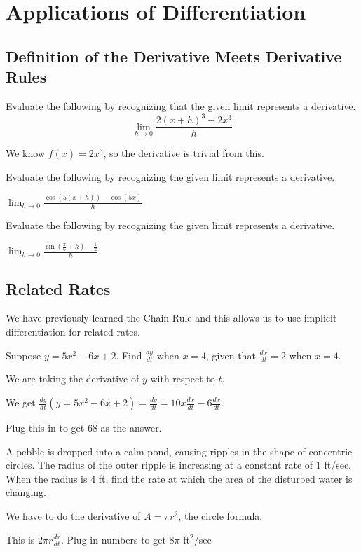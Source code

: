 \documentclass[../bccalc.tex]{subfiles}
\begin{document}
\chapter{Applications of Differentiation}
\section{Definition of the Derivative Meets Derivative Rules}
\begin{example}
    Evaluate the following by recognizing that the given limit represents a derivative. 
    \[ \lim_{h\to 0} \frac{2(x+h)^3-2x^3}{h} \]

    We know $f(x)=2x^3$, so the derivative is trivial from this.
\end{example}

\ex Evaluate the following by recognizing the given limit represents a derivative. 

$\lim_{h\to 0} \frac{\cos (5(x+h)) - \cos(5x)}{h}$

\ex Evaluate the following by recognizing the given limit represents a derivative. 

$\lim_{h\to 0} \frac{\sin \left(\frac{\pi}{6}+h\right)-\frac{1}{2}}{h}$

\section{Related Rates}
We have previously learned the Chain Rule and this allows us to use implicit differentiation for related rates.

\begin{example}
    Suppose $y=5x^2-6x+2$. Find $\frac{dy}{dt}$ when $x=4$, given that $\frac{dx}{dt}=2$ when $x=4$.

    We are taking the derivative of $y$ with respect to $t$.

    We get $\frac{dy}{dt}(y=5x^2-6x+2)=\frac{dy}{dt}=10x\frac{dx}{dt}-6\frac{dx}{dt}$.

    Plug this in to get $68$ as the answer.
\end{example}

\begin{example}
    A pebble is dropped into a calm pond, causing ripples in the shape of concentric circles. The radius of the outer ripple is increasing at a constant rate of 1 ft/sec. When the radius is 4 ft, find the rate at which the area of the disturbed water is changing.

    We have to do the derivative of $A=\pi r^2$, the circle formula.

    This is $2\pi r \frac{dr}{dt}$. Plug in numbers to get $8 \pi$ ft$^2$/sec
\end{example}
\end{document}
